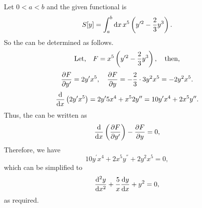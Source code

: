 \def\yp2{y^{\prime2}}%
\def\2o3{\frac{2}{3}}%
\def\func{x^5 \lr{\yp2 - \2o3y^3}}
Let $0 < a < b$ and the given functional is
\[
	S[y] = \Int{a}{b}{x} \func.
\]
So the \el can be determined as follows.
\[
	\textrm{Let,}\quad F = \func, \quad\textrm{then,}
\]
\[
	\pderiv{F}{y^\prime} = 2y^\prime x^5,\quad \pderiv{F}{y} = -\2o3\cdot3y^2x^5 = -2y^2x^5.
\]
\[
	\deriv{}{x}\lr{2y^\prime x^5} = 2y^\prime5x^4 + x^52y^\dprime = 10y^\prime x^4 + 2x^5y^\dprime.
\]
Thus, the \el can be written as
\[
	\ELE{F}{x}{y},
\]
Therefore, we have
\[
	10y^\prime x^4 + 2x^5y^\dprime + 2y^2x^5 = 0,
\]
which can be simplified to
\[
	\deriv{^2y}{x^2} + \frac{5}{x}\deriv{y}{x} + y^2 = 0,
\]
as required.
